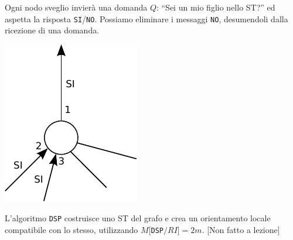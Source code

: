 Ogni nodo sveglio invierà una domanda $Q$: ``Sei un mio figlio nello ST?'' ed
aspetta la risposta \texttt{SI}/\texttt{NO}. Possiamo eliminare i messaggi
\texttt{NO}, desumendoli dalla ricezione di una domanda.


\begin{center}
    \includegraphics[scale=0.75]{capitoli/esplorazione-grafo-anonimo/imgs/n_32}
\end{center}

\begin{theorem}
    L'algoritmo \texttt{DSP} costruisce uno ST del grafo e crea un
    orientamento locale compatibile con lo stesso, utilizzando $M[$\texttt{DSP}$/
                RI] = 2m$. [Non fatto a lezione]
\end{theorem}

